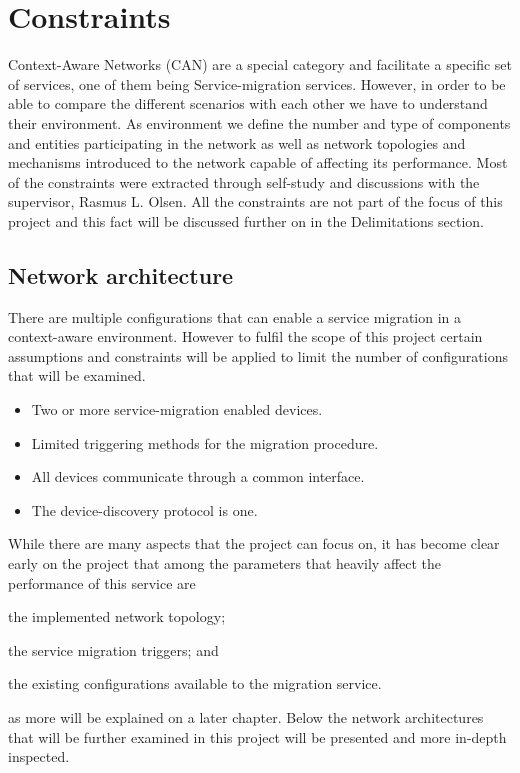 \section{Constraints}
\label{sec:constraints}

Context-Aware Networks (CAN) are a special category and facilitate a specific set of services, one of them being Service-migration services. However, in order to be able to compare the different scenarios with each other we have to understand their environment. As environment we define the number and type of components and entities participating in the network as well as network topologies and mechanisms introduced to the network capable of affecting its performance. Most of the constraints were extracted through self-study and discussions with the supervisor, Rasmus L. Olsen. All the constraints are not part of the focus of this project and this fact will be discussed further on in the Delimitations section.

\subsection{Network architecture}
\label{net_arch}
There are multiple configurations that can enable a service migration in a context-aware environment. However to fulfil the scope of this project certain assumptions and constraints will be applied to limit the number of configurations that will be examined.

\begin{itemize}
\item Two or more service-migration enabled devices.
\item Limited triggering methods for the migration procedure.
\item All devices communicate through a common interface.
\item The device-discovery protocol is one.
\end{itemize}

While there are many aspects that the project can focus on, it has become clear early on the project that among the parameters that heavily affect the performance of this service are \begin{inparaenum}
\item the implemented network topology;
\item the service migration triggers; and
\item the existing configurations available to the migration service.
\end{inparaenum} as more will be explained on a later chapter. Below the network architectures that will be further examined in this project will be presented and more in-depth inspected.

